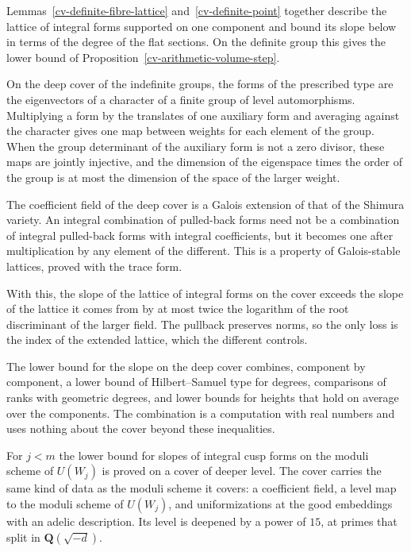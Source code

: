 Lemmas~\ref{cv-definite-fibre-lattice} and~\ref{cv-definite-point} together describe the lattice of
integral forms supported on one component and bound its slope below in terms of the degree of the
flat sections. On the definite group this gives the
lower bound of Proposition~\ref{cv-arithmetic-volume-step}.

On the deep cover of the indefinite groups, the forms of the prescribed type are the eigenvectors of
a character of a finite group of level automorphisms. Multiplying a form by the translates of one
auxiliary form and averaging against the character gives one map between weights for each element
of the group. When the group determinant of the auxiliary form is not a zero divisor, these maps
are jointly injective, and the dimension of the eigenspace times the order of the group is at most
the dimension of the space of the larger weight.

The coefficient field of the deep cover is a Galois extension of that of the Shimura variety. An
integral combination of pulled-back forms need not be a combination of integral pulled-back forms
with integral coefficients, but it becomes one after multiplication by any element of the
different. This is a property of Galois-stable lattices, proved with the trace form.

With this, the slope of the lattice of integral forms on the cover exceeds the slope of the lattice
it comes from by at most twice the logarithm of the root discriminant of the larger field. The
pullback preserves norms, so the only loss is the index of the extended lattice, which the
different controls.

The lower bound for the slope on the deep cover combines, component by component, a lower bound of
Hilbert--Samuel type for degrees, comparisons of ranks with geometric degrees, and lower bounds for
heights that hold on average over the components. The combination is a computation with real
numbers and uses nothing about the cover beyond these inequalities.

For $j<m$ the lower bound for slopes of integral cusp forms on the moduli scheme of $U(W_j)$ is
proved on a cover of deeper level. The cover carries the same kind of data as the moduli scheme it
covers: a coefficient field, a level map to the moduli scheme of $U(W_j)$, and uniformizations at
the good embeddings with an adelic description. Its level is deepened by a power of $15$, at primes
that split in $\mathbf Q(\sqrt{-d})$.

